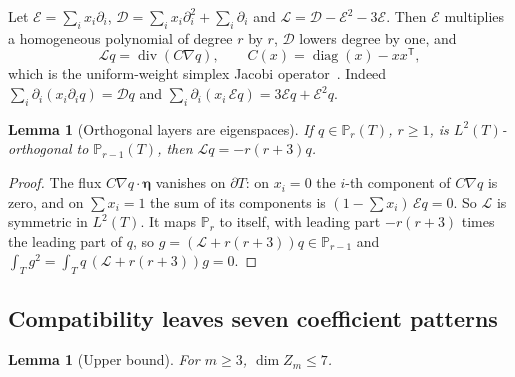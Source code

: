 \documentclass[11pt,a4paper]{article}
\newtheorem{lemma}[theorem]{Lemma}
\theoremstyle{definition}
\theoremstyle{remark}
\newcommand{\Pol}{\mathbb P}
\begin{document}
Let \(\mathcal E=\sum_ix_i\partial_i\), \(\mathcal D=\sum_ix_i\partial_i^2+\sum_i\partial_i\)
and \(\mathcal L=\mathcal D-\mathcal E^2-3\mathcal E\). Then \(\mathcal E\)
multiplies a homogeneous polynomial of degree \(r\) by \(r\), \(\mathcal D\)
lowers degree by one, and
\begin{equation}
 \mathcal Lq=\operatorname{div}(C\nabla q),\qquad C(x)=\operatorname{diag}(x)-xx^{\mathsf T},
 \label{eq:divform}
\end{equation}
which is the uniform-weight simplex Jacobi operator~\cite[Eq.~(1.2)]{AX2013}.
Indeed \(\sum_i\partial_i(x_i\partial_iq)=\mathcal Dq\) and
\(\sum_i\partial_i(x_i\,\mathcal Eq)=3\mathcal Eq+\mathcal E^2q\).

\begin{lemma}[Orthogonal layers are eigenspaces]
\label{lem:jacobi}
If \(q\in\Pol_r(T)\), \(r\ge1\), is \(L^2(T)\)-orthogonal to \(\Pol_{r-1}(T)\), then
\(\mathcal Lq=-r(r+3)q\).
\end{lemma}

\begin{proof}
The flux \(C\nabla q\cdot\boldsymbol\eta\) vanishes on \(\partial T\): on
\(x_i=0\) the \(i\)-th component of \(C\nabla q\) is zero, and on
\(\sum x_i=1\) the sum of its components is \((1-\sum x_i)\,\mathcal Eq=0\).
So \(\mathcal L\) is symmetric in \(L^2(T)\). It maps \(\Pol_r\) to itself, with
leading part \(-r(r+3)\) times the leading part of \(q\), so
\(g=(\mathcal L+r(r+3))q\in\Pol_{r-1}\) and
\(\int_Tg^2=\int_Tq\,(\mathcal L+r(r+3))g=0\).
\end{proof}

\subsection{Compatibility leaves seven coefficient patterns}

\begin{lemma}[Upper bound]
\label{lem:upper}
For \(m\ge3\), \(\dim Z_m\le7\).
\end{lemma}
\end{document}
